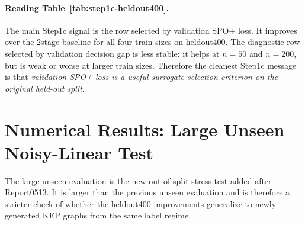 \documentclass[11pt]{article}
\begin{document}
\paragraph{Reading Table~\ref{tab:step1c-heldout400}.}
The main Step1c signal is the row selected by validation SPO+ loss. It improves
over the 2stage baseline for all four train sizes on heldout400. The diagnostic
row selected by validation decision gap is less stable: it helps at \(n=50\) and
\(n=200\), but is weak or worse at larger train sizes. Therefore the cleanest
Step1c message is that \emph{validation SPO+ loss is a useful surrogate-selection
criterion on the original held-out split}.

\section{Numerical Results: Large Unseen Noisy-Linear Test}

The large unseen evaluation is the new out-of-split stress test added after
Report0513. It is larger than the previous unseen evaluation and is therefore a
stricter check of whether the heldout400 improvements generalize to newly
generated KEP graphs from the same label regime.
\end{document}
